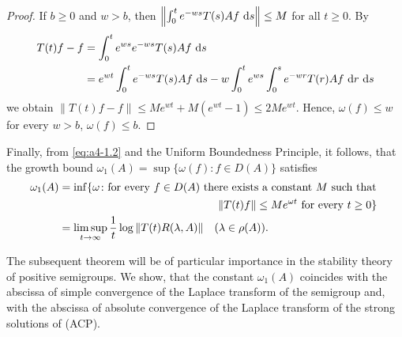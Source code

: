 \begin{proof}


If $b \geq 0$ and $w > b$, then $\left\|\int_{0}^{t} e^{-w s} T(s)Af\,\mathop{}\!\mathrm{d}{s}\right\| \leq M$ for all $t \geq 0$. 
By 
\begin{align*}
T(t)f - f &= \int_{0}^{t} e^{w s} e^{-w s} T(s)Af \,\mathop{}\!\mathrm{d}{s}\\
&= e^{wt}\int_0^t e^{-ws} T(s)Af\,\mathop{}\!\mathrm{d}{s} - w\int_0^te^{ws}\int_0^s e^{-wr} T(r)Af\, \mathop{}\!\mathrm{d}{r}\,\mathop{}\!\mathrm{d}{s}
\end{align*}
we obtain $\|T(t)f-f\| \leq Me^{w t} + M(e^{w t} - 1)
\le 2Me^{wt}$. 
Hence, $\omega(f)\le w$ for every $w > b$, \ie $\omega(f) \leq b$.
\end{proof}
Finally, from \eqref{eq:a4-1.2} and the Uniform Boundedness Principle, it follows, that the growth bound $\omega_{1}(A) = \sup\{\omega(f) \colon f \in D(A)\}$ satisfies
\begin{align}\label{eq:a4-1.3}
\omega_1(A) &= \inf\{\omega \colon \text{for every } f \in D(A) \text{ there exists a constant } M \text{ such that }\\
& \hskip 2 true in \|T(t)f\| \leq Me^{\omega t} \text{ for every } t \geq 0\} \notag\\
&=
\limsup_{t \to \infty} \frac{1}{t} \log\|T(t)R(\lambda,A)\| \quad (\lambda \in \rho(A)). 
\notag
\end{align}



The subsequent theorem will be of particular importance in the stability theory of positive semigroups.
We show, that the constant $\omega_{1}(A)$ coincides with the abscissa of simple convergence of the Laplace transform of the semigroup and, with the abscissa of absolute convergence of the Laplace transform of the strong solutions of (ACP).

